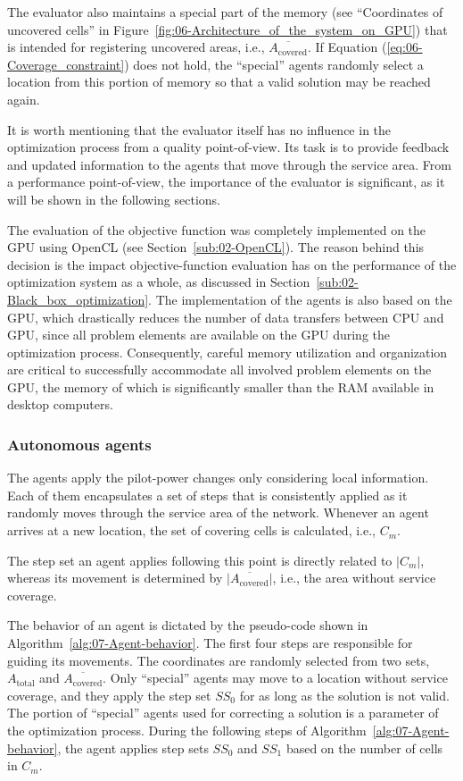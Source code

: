 The evaluator also maintains a special part of the memory (see ``Coordinates
of uncovered cells'' in Figure~\ref{fig:06-Architecture_of_the_system_on_GPU})
that is intended for registering uncovered areas, i.e., $\overline{A_{\mathrm{covered}}}$.
If Equation (\ref{eq:06-Coverage_constraint}) does not hold, the
``special'' agents randomly select a location from this portion
of memory so that a valid solution may be reached again.

It is worth mentioning that the evaluator itself has no influence
in the optimization process from a quality point-of-view. Its task
is to provide feedback and updated information to the agents that
move through the service area. From a performance point-of-view, the
importance of the evaluator is significant, as it will be shown in
the following sections.

\bigskip{}


The evaluation of the objective function was completely implemented
on the GPU using OpenCL (see Section~\ref{sub:02-OpenCL}). The reason
behind this decision is the impact objective-function evaluation has
on the performance of the optimization system as a whole, as discussed
in Section~\ref{sub:02-Black_box_optimization}. The implementation
of the agents is also based on the GPU, which drastically reduces
the number of data transfers between CPU and GPU, since all problem
elements are available on the GPU during the optimization process.
Consequently, careful memory utilization and organization are critical
to successfully accommodate all involved problem elements on the GPU,
the memory of which is significantly smaller than the RAM available
in desktop computers.


\subsubsection{Autonomous agents}

The agents apply the pilot-power changes only considering local information.
Each of them encapsulates a set of steps that is consistently applied
as it randomly moves through the service area of the network. Whenever
an agent arrives at a new location, the set of covering cells is calculated,
i.e., $C_{m}$.

The step set an agent applies following this point is directly related
to $\vert C_{m}\vert$, whereas its movement is determined by $\vert\overline{A_{\mathrm{covered}}}\vert$,
i.e., the area without service coverage.

The behavior of an agent is dictated by the pseudo-code shown in Algorithm~\ref{alg:07-Agent-behavior}.
The first four steps are responsible for guiding its movements. The
coordinates are randomly selected from two sets, $A_{\mathrm{total}}$
and $\overline{A_{\mathrm{covered}}}$. Only ``special'' agents
may move to a location without service coverage, and they apply the
step set $SS_{0}$ for as long as the solution is not valid. The portion
of ``special'' agents used for correcting a solution is a parameter
of the optimization process. During the following steps of Algorithm~\ref{alg:07-Agent-behavior},
the agent applies step sets $SS_{0}$ and $SS_{1}$ based on the number
of cells in $C_{m}$.

